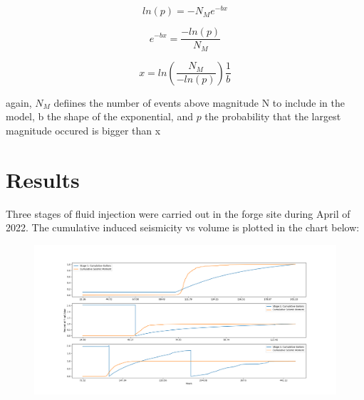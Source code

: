 \documentclass{article}
\begin{document}
    \begin{equation}
    \tag{ln(1+dx) $\approx$ dx}
    ln(p) = -N_M e^{-bx}
    \end{equation}
    
    \begin{equation}
    \tag{simplify expression}
    e^{-bx} = \frac{-ln(p)}{N_M}
\end{equation}

\begin{equation}
    \tag{apply ln, simplify }
    x = ln(\frac{N_M}{-ln(p)}) \frac{1}{b}
\end{equation}

again, $N_M$ defiines the number of events above magnitude N to include in the model, b the shape of the exponential, and $p$ the probability that the largest magnitude occured is bigger than x

\section{Results}

    Three stages of fluid injection were carried out in the forge site during April of 2022. The cumulative induced seismicity vs volume is plotted in the chart below:
    \begin{figure}[H]        
        \centering
        \includegraphics*[width = \textwidth, height = \textheight, keepaspectratio]{stageplot.png}
    \end{figure}
\end{document}
